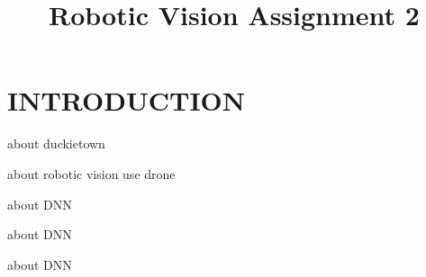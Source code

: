 \documentclass[letterpaper, 10 pt, conference]{ieeeconf}  %
\title{\LARGE \bf
Robotic Vision Assignment 2
}
\begin{document}
\maketitle
\thispagestyle{empty}
\pagestyle{empty}

\section{INTRODUCTION}

about duckietown \cite{duckietown-icra}

about robotic vision use drone \cite{giusti2016machine}

about DNN \cite{Giusti2014comparison}

about DNN \cite{Ciresan2013mitosis}
   
about DNN \cite{Veta2015assessment}



\addtolength{\textheight}{-12cm}   %







\end{document}
